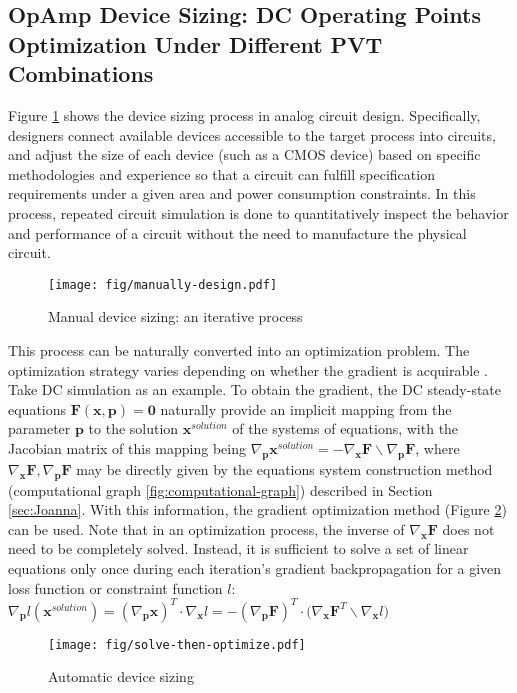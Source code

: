 \subsection{OpAmp Device Sizing: DC Operating Points Optimization Under Different PVT Combinations}
Figure \ref{fig:manually-design} shows the device sizing process in analog circuit design. Specifically, designers connect available devices accessible to the target process into circuits, and adjust the size of each device (such as a CMOS device) based on specific methodologies and experience so that a circuit can fulfill specification requirements under a given area and power consumption constraints. In this process, repeated circuit simulation is done to quantitatively inspect the behavior and performance of a circuit without the need to manufacture the physical circuit.
\begin{figure}[htpb]
  \centering
  \texttt{[image: fig/manually-design.pdf]}
  \caption{Manual device sizing: an iterative process}
  \label{fig:manually-design}
\end{figure}

This process can be naturally converted into an optimization problem. The optimization strategy varies depending on whether the gradient is acquirable \cite{zhan2004optimization,agrawal2006circuit,huang2013efficient,nieuwoudt2005multi,peng2016efficient,girardi2011analog,lyu2018batch,wang2014enabling,lyu2017efficient,tang2018parametric}. Take DC simulation as an example. To obtain the gradient, the DC steady-state equations $\bm{F}(\bm{x},\bm{p})=\bm{0}$ naturally provide an implicit mapping from the parameter $\bm{p}$ to the solution $\bm{x}^{solution}$ of the systems of equations, with the Jacobian matrix of this mapping being $\nabla_{\bm{p}}\bm{x}^{solution}=-\nabla_{\bm{x}}\bm{F}\backslash\nabla_{\bm{p}}\bm{F}$, where $\nabla_{\bm{x}}\bm{F},\nabla_{\bm{p}}\bm{F}$ may be directly given by the equations system construction method (computational graph \ref{fig:computational-graph}) described in Section \ref{sec:Joanna}.
With this information, the gradient optimization method (Figure \ref{fig:solve-then-optimize}) can be used.
Note that in an optimization process, the inverse of $\nabla_{\bm{x}}\bm{F}$ does not need to be completely solved.
Instead, it is sufficient to solve a set of linear equations only once during each iteration's gradient backpropagation for a given loss function or constraint function $l$:
$\nabla_{\bm{p}}l(\bm{x}^{solution})=(\nabla_{\bm{p}}\bm{x})^T\cdot\nabla_{\bm{x}}l
=-(\nabla_{\bm{p}}\bm{F})^T\cdot\big(\nabla_{\bm{x}}\bm{F}^T\backslash\nabla_{\bm{x}}l\big)$
\begin{figure}[htpb]
  \centering
    \texttt{[image: fig/solve-then-optimize.pdf]}
  \caption{Automatic device sizing}
  \label{fig:solve-then-optimize}
\end{figure}

